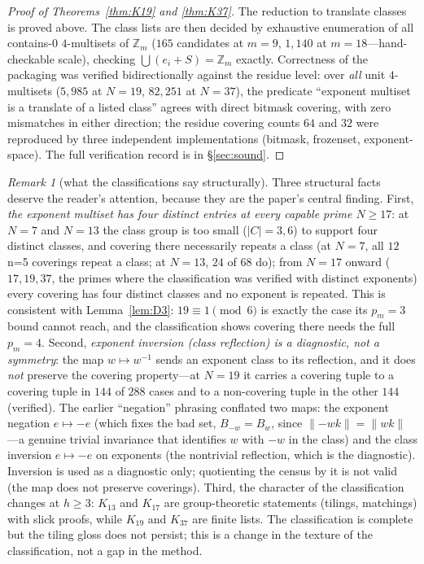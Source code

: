 \documentclass[11pt,a4paper]{article}
\numberwithin{equation}{section}
\theoremstyle{plain}
\theoremstyle{definition}
\theoremstyle{remark}
\newtheorem{remark}[theorem]{Remark}
\newcommand{\Z}{\mathbb{Z}}
\begin{document}
\begin{proof}[Proof of Theorems~\ref{thm:K19} and \ref{thm:K37}]
The reduction to translate classes is proved above. The class lists are
then decided by exhaustive enumeration of all contains-$0$ $4$-multisets
of $\Z_m$ ($165$ candidates at $m=9$, $1{,}140$ at $m=18$---hand-checkable
scale), checking $\bigcup(e_i+S)=\Z_m$ exactly. Correctness of the
packaging was verified bidirectionally against the residue level: over
\emph{all} unit $4$-multisets ($5{,}985$ at $N=19$, $82{,}251$ at
$N=37$), the predicate ``exponent multiset is a translate of a listed
class'' agrees with direct bitmask covering, with zero mismatches in
either direction; the residue covering counts $64$ and $32$ were
reproduced by three independent implementations (bitmask, frozenset,
exponent-space). The full verification record is in \S\ref{sec:sound}.
\end{proof}

\begin{remark}[what the classifications say structurally]\label{rem:pattern}
Three structural facts deserve the reader's attention, because they are
the paper's central finding. First, \emph{the exponent multiset has four
distinct entries at every capable prime $N\ge 17$}: at $N=7$ and $N=13$
the class group is too small ($|C|=3,6$) to support four distinct
classes, and covering there necessarily repeats a class (at $N=7$, all
$12$ n=5 coverings repeat a class; at $N=13$, $24$ of $68$ do); from
$N=17$ onward ($17,19,37$, the primes where the classification was
verified with distinct exponents) every covering has four distinct
classes and no exponent is repeated. This is consistent with
Lemma~\ref{lem:D3}: $19\equiv 1\pmod 6$ is exactly the case its $p_m=3$
bound cannot reach, and the classification shows covering there needs the
full $p_m=4$. Second, \emph{exponent inversion (class reflection) is a
diagnostic, not a symmetry}: the map $w\mapsto w^{-1}$ sends an exponent
class to its reflection, and it does \emph{not} preserve the covering
property---at $N=19$ it carries a covering tuple to a covering tuple in
$144$ of $288$ cases and to a non-covering tuple in the other $144$
(verified). The earlier ``negation'' phrasing conflated two maps: the
exponent negation $e\mapsto-e$ (which fixes the bad set, $B_{-w}=B_w$,
since $\lVert-wk\rVert=\lVert wk\rVert$---a genuine trivial invariance
that identifies $w$ with $-w$ in the class) and the class inversion
$e\mapsto-e$ on exponents (the nontrivial reflection, which is the
diagnostic). Inversion is used as a diagnostic only; quotienting the census by
it is not valid (the map does not preserve coverings). Third, the character
of the classification changes at $h\ge 3$: $K_{13}$ and $K_{17}$ are
group-theoretic statements (tilings, matchings) with slick proofs, while
$K_{19}$ and $K_{37}$ are finite lists. The classification is complete but
the tiling gloss does not persist; this is a change in the texture of
the classification, not a gap in the method.
\end{remark}
\end{document}
